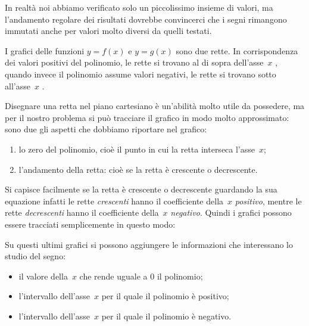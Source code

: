 In realtà noi abbiamo verificato solo un piccolissimo insieme di valori, 
ma l'andamento regolare dei risultati dovrebbe convincerci che i segni 
rimangono immutati anche per valori molto diversi da quelli testati.

I grafici delle funzioni \(y=f(x)\) e \(y=g(x)\) sono due rette. 
In corrispondenza dei valori positivi del polinomio, le rette si trovano al 
di sopra dell'asse~\(x\)%
, quando invece il polinomio assume valori negativi, le rette si trovano 
sotto all'asse~\(x\)%
.

Disegnare una retta nel piano cartesiano è un'abilità molto utile da 
possedere, ma per il nostro problema si può tracciare il grafico in modo 
molto approssimato: sono due gli aspetti che dobbiamo riportare nel grafico:

\begin{enumerate} [noitemsep]
 \item 
  lo zero del polinomio, cioè il punto in cui la retta interseca 
  l'asse~\(x\);
 \item
  l'andamento della retta: cioè se la retta è crescente o decrescente.
\end{enumerate}

Si capisce facilmente se la retta è crescente o decrescente guardando la sua 
equazione infatti le rette \emph{crescenti} hanno il coefficiente della~\(x\) 
\emph{positivo}, mentre le rette \emph{decrescenti} hanno il coefficiente 
della~\(x\) \emph{negativo}.
Quindi i grafici possono essere tracciati semplicemente in questo modo:

 \centering
 \begin{minipage}[]{.45\textwidth}
  \centering{}
 \end{minipage}
 \begin{minipage}[]{.45\textwidth}
  \centering{}
 \end{minipage}

Su questi ultimi grafici si possono aggiungere le informazioni che 
interessano lo studio del segno:

\begin{itemize} [noitemsep]
 \item il valore della~\(x\) che rende uguale a 0 il polinomio;
 \item l'intervallo dell'asse~\(x\) per il quale il polinomio è positivo;
 \item l'intervallo dell'asse~\(x\) per il quale il polinomio è negativo.
\end{itemize}

